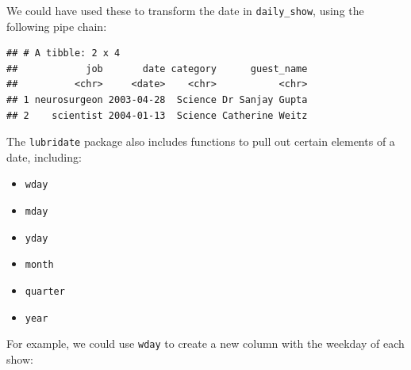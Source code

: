 \documentclass[]{book}
\makeatletter
\newenvironment{Shaded}{\begin{snugshade}}{\end{snugshade}}
\newcommand{\KeywordTok}[1]{\textcolor[rgb]{0.13,0.29,0.53}{\textbf{#1}}}
\newcommand{\DataTypeTok}[1]{\textcolor[rgb]{0.13,0.29,0.53}{#1}}
\newcommand{\DecValTok}[1]{\textcolor[rgb]{0.00,0.00,0.81}{#1}}
\newcommand{\StringTok}[1]{\textcolor[rgb]{0.31,0.60,0.02}{#1}}
\newcommand{\OtherTok}[1]{\textcolor[rgb]{0.56,0.35,0.01}{#1}}
\newcommand{\OperatorTok}[1]{\textcolor[rgb]{0.81,0.36,0.00}{\textbf{#1}}}
\newcommand{\NormalTok}[1]{#1}
\providecommand{\tightlist}{%
  \setlength{\itemsep}{0pt}\setlength{\parskip}{0pt}}
\newenvironment{kframe}{%
\medskip{}
\setlength{\fboxsep}{.8em}
 \def\at@end@of@kframe{}%
 \ifinner\ifhmode%
  \def\at@end@of@kframe{\end{minipage}}%
  \begin{minipage}{\columnwidth}%
 \fi\fi%
 \def\FrameCommand##1{\hskip\@totalleftmargin \hskip-\fboxsep
 \colorbox{shadecolor}{##1}\hskip-\fboxsep
     \hskip-\linewidth \hskip-\@totalleftmargin \hskip\columnwidth}%
 \MakeFramed {\advance\hsize-\width
   \@totalleftmargin\z@ \linewidth\hsize
   \@setminipage}}%
 {\par\unskip\endMakeFramed%
 \at@end@of@kframe}
\renewenvironment{Shaded}{\begin{kframe}}{\end{kframe}}
\theoremstyle{definition}
\theoremstyle{definition}
\theoremstyle{definition}
\theoremstyle{remark}
\makeatother
\begin{document}
We could have used these to transform the date in \texttt{daily\_show},
using the following pipe chain:

\begin{Shaded}
\end{Shaded}

\begin{verbatim}
## # A tibble: 2 x 4
##            job       date category      guest_name
##          <chr>     <date>    <chr>           <chr>
## 1 neurosurgeon 2003-04-28  Science Dr Sanjay Gupta
## 2    scientist 2004-01-13  Science Catherine Weitz
\end{verbatim}

The \texttt{lubridate} package also includes functions to pull out
certain elements of a date, including:

\begin{itemize}
\tightlist
\item
  \texttt{wday}
\item
  \texttt{mday}
\item
  \texttt{yday}
\item
  \texttt{month}
\item
  \texttt{quarter}
\item
  \texttt{year}
\end{itemize}

For example, we could use \texttt{wday} to create a new column with the
weekday of each show:

\begin{Shaded}
\end{Shaded}
\end{document}

